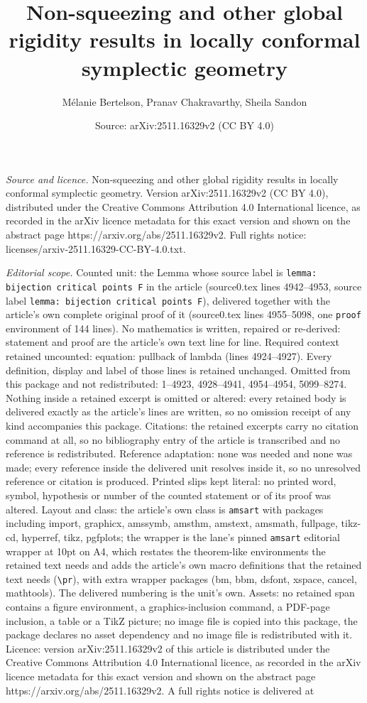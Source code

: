 \documentclass[10pt,a4paper]{amsart}
\title[Non-squeezing and other global rigidity results in locally c]{Non-squeezing and other global rigidity results in locally conformal symplectic geometry}
\author{M\'elanie Bertelson, Pranav Chakravarthy, Sheila Sandon}
\date{Source: arXiv:2511.16329v2 (CC BY 4.0)}
\begin{document}
\maketitle

\noindent\emph{Source and licence.} Non-squeezing and other global rigidity results in locally conformal symplectic geometry. Version arXiv:2511.16329v2 (CC BY 4.0), distributed under the Creative Commons Attribution 4.0 International licence, as recorded in the arXiv licence metadata for this exact version and shown on the abstract page https://arxiv.org/abs/2511.16329v2. Full rights notice: licenses/arxiv-2511.16329-CC-BY-4.0.txt.\par\smallskip

\noindent\textit{Editorial scope.} Counted unit: the Lemma whose source label is \texttt{lemma: bijection critical points F} in the article (source0.tex lines 4942--4953, source label \texttt{lemma: bijection critical points F}), delivered together with the article's own complete original proof of it (source0.tex lines 4955--5098, one \texttt{proof} environment of 144 lines). No mathematics is written, repaired or re-derived: statement and proof are the article's own text line for line. Required context retained uncounted: equation: pullback of lambda (lines 4924--4927). Every definition, display and label of those lines is retained unchanged. Omitted from this package and not redistributed: 1--4923, 4928--4941, 4954--4954, 5099--8274. Nothing inside a retained excerpt is omitted or altered: every retained body is delivered exactly as the article's lines are written, so no omission receipt of any kind accompanies this package. Citations: the retained excerpts carry no citation command at all, so no bibliography entry of the article is transcribed and no reference is redistributed. Reference adaptation: none was needed and none was made; every reference inside the delivered unit resolves inside it, so no unresolved reference or citation is produced. Printed slips kept literal: no printed word, symbol, hypothesis or number of the counted statement or of its proof was altered. Layout and class: the article's own class is \texttt{amsart} with packages including import, graphicx, amssymb, amsthm, amstext, amsmath, fullpage, tikz-cd, hyperref, tikz, pgfplots; the wrapper is the lane's pinned \texttt{amsart} editorial wrapper at 10pt on A4, which restates the theorem-like environments the retained text needs and adds the article's own macro definitions that the retained text needs (\texttt{\textbackslash pr}), with extra wrapper packages (bm, bbm, dsfont, xspace, cancel, mathtools). The delivered numbering is the unit's own. Assets: no retained span contains a figure environment, a graphics-inclusion command, a PDF-page inclusion, a table or a TikZ picture; no image file is copied into this package, the package declares no asset dependency and no image file is redistributed with it. Licence: version arXiv:2511.16329v2 of this article is distributed under the Creative Commons Attribution 4.0 International licence, as recorded in the arXiv licence metadata for this exact version and shown on the abstract page https://arxiv.org/abs/2511.16329v2. A full rights notice is delivered at 
\end{document}

